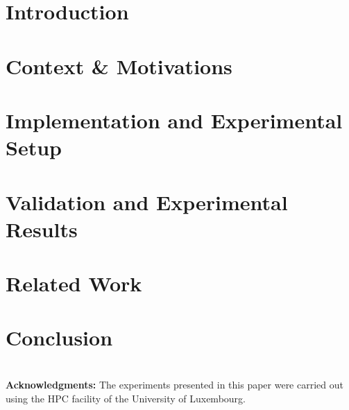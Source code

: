 \documentclass{sig-alternate}
\begin{document}


\section{Introduction}
\label{sec:introduction}


\section{Context \& Motivations}
\label{sec:context}


\section{Implementation and Experimental Setup}
\label{sec:implem}\label{sec:experimental_setup}


\section{Validation and Experimental Results}
\label{sec:experiments}


\section{Related Work}
\label{sec:related_works}


\section{Conclusion}
\label{sec:conclusion}


~\\
{\noindent \textbf{Acknowledgments:}}
The experiments presented in this paper were carried
out using the HPC facility of the University of Luxembourg.




\appendix



\end{document}
